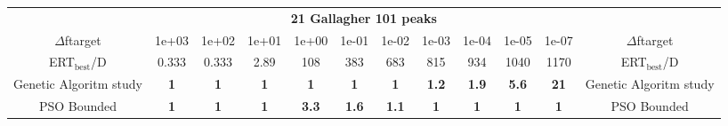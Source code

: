 \begin{tabular}{cccccccccccc}
 & \multicolumn{10}{c}{{\normalsize \textbf{21 Gallagher 101 peaks}}}\\
$\Delta$ftarget& 1e+03& 1e+02& 1e+01& 1e+00& 1e-01& 1e-02& 1e-03& 1e-04& 1e-05& 1e-07 & $\Delta$ftarget \\
ERT$_{\textrm{best}}$/D& 0.333& 0.333& 2.89& 108& 383& 683& 815& 934& 1040& 1170 & ERT$_{\textrm{best}}$/D \\
\hline
Genetic Algoritm study & \textbf{1} & \textbf{1} & \textbf{1} & \textbf{1} & \textbf{1} & \textbf{1} & \textbf{1.2} & \textbf{1.9} & \textbf{5.6} & \textbf{21} & Genetic Algoritm study \cite{add_an_entry_for_Genetic Algoritm study_in_bbob.bib}\\
PSO Bounded & \textbf{1} & \textbf{1} & \textbf{1} & \textbf{3.3} & \textbf{1.6} & \textbf{1.1} & \textbf{1} & \textbf{1} & \textbf{1} & \textbf{1} & PSO Bounded \cite{add_an_entry_for_PSO Bounded_in_bbob.bib}
\end{tabular}
